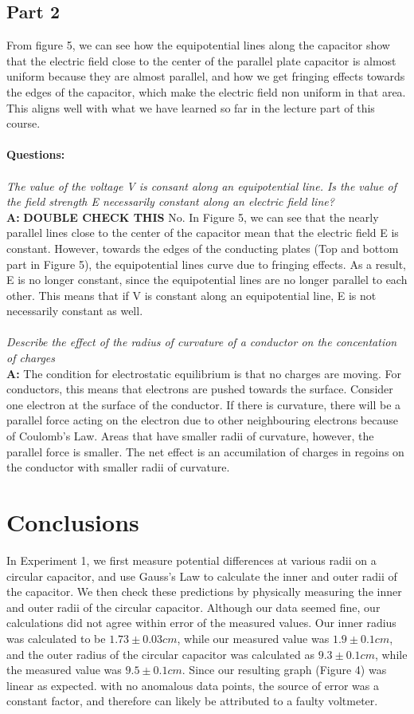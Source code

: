 \documentclass[letterpaper]{article}
\begin{document}
\subsection{Part 2}
From figure 5, we can see how the equipotential lines along the capacitor show that the
electric field close to the center of the parallel plate capacitor is almost uniform because they are almost parallel, and
how we get fringing effects towards the edges of the capacitor, which make the electric field non uniform
in that area. This aligns well with what we have learned so far in the lecture part of this course.
\\ \\
\textbf{Questions: }\\ \\
\textit{The value of the voltage V is consant along an equipotential line.
Is the value of the field strength E necessarily constant along an electric field line?}\\
\textbf{A:}
\textbf{DOUBLE CHECK THIS} No. In Figure 5, we can see that
the nearly parallel lines close to the center of the capacitor mean that the electric field E is constant.
However, towards the edges of the conducting plates (Top and bottom part in Figure 5), the equipotential lines
curve due to fringing effects. As a result, E is no longer constant, since the equipotential lines
are no longer parallel to each other. This means that if V is constant along an equipotential line,
E is not necessarily constant as well.\\ \\
\textit{Describe the effect of the radius of curvature of a conductor on the concentation of charges}\\
\textbf{A:}
The condition for electrostatic equilibrium is that no charges are moving. For conductors, this means
that electrons are pushed towards the surface. Consider one electron at the surface of the conductor.
If there is curvature, there will be a parallel force acting on the electron due to other neighbouring
electrons because of Coulomb's Law. Areas that have smaller radii of curvature, however, the
parallel force is smaller. The net effect is an accumilation of charges in regoins on the conductor with
smaller radii of curvature.

\section{Conclusions}
In Experiment 1, we first measure potential differences at various radii on a circular capacitor,
and use Gauss's Law to calculate the inner and outer radii of the capacitor. We then check these predictions
by physically measuring the inner and outer radii of the circular capacitor. Although our data seemed
fine, our calculations did not agree within error of the measured values. Our inner radius was calculated to be
$1.73 \pm 0.03 cm$, while our measured value was $1.9 \pm 0.1 cm$, and the outer radius of the circular capacitor
was calculated as $9.3 \pm 0.1 cm$, while the measured value was $9.5 \pm 0.1 cm$. Since our resulting graph (Figure 4)
was linear as expected. with no anomalous data points, the source of error was a constant factor, and therefore can
likely be attributed to a faulty voltmeter.
\end{document}
